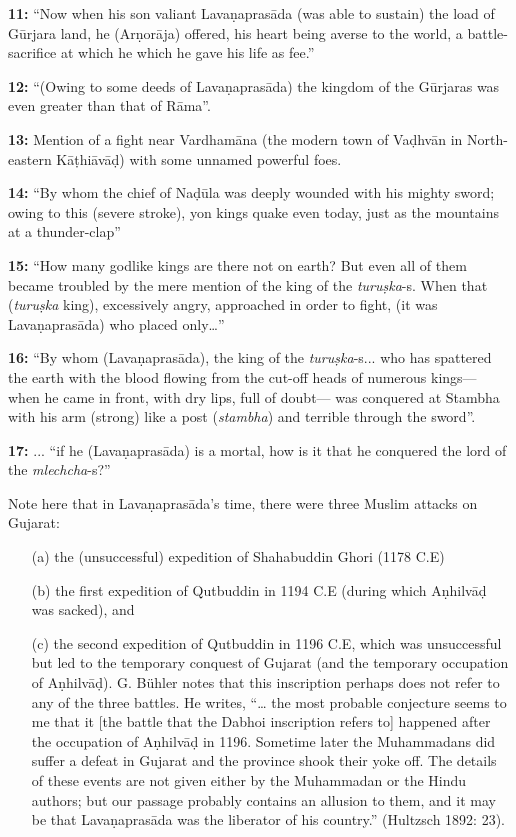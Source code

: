 \smallskip
\noindent
{\bf 11:} “Now when his son valiant Lavaṇaprasāda  (was able to sustain) the load of Gūrjara land, he (Arṇorāja) offered, his heart being averse to the world, a battle-sacrifice at which he which he gave his life as fee.”

\smallskip
\noindent
{\bf 12:} “(Owing to some deeds of Lavaṇaprasāda) the kingdom of the Gūrjaras was even greater than that of Rāma”. 

\smallskip
\noindent
{\bf 13:} Mention of a fight near Vardhamāna (the modern town of Vaḍhvān in North-eastern Kāṭhiāvāḍ) with some unnamed powerful foes.

\smallskip
\noindent
{\bf 14:} “By whom the chief of Naḍūla was deeply wounded with his mighty sword; owing to this (severe stroke), yon kings quake even today, just as the mountains at a thunder-clap”

\smallskip
\noindent
{\bf 15:} “How many godlike kings are there not on earth? But even all of them became troubled by the mere mention of the king of the {\sl turuṣka}-s. When that ({\sl turuṣka} king), excessively angry, approached in order to fight, (it was Lavaṇaprasāda) who placed only…”

\smallskip
\noindent
{\bf 16:} “By whom (Lavaṇaprasāda), the king of the {\sl turuṣka}-s... who has spattered the earth with the blood flowing from the cut-off heads of numerous kings— when he came in front, with dry lips, full of doubt— was conquered at Stambha with his arm (strong) like a post ({\sl stambha}) and terrible through the sword”.


\smallskip
\noindent
{\bf 17:} ... “if he (Lavaṇaprasāda) is a mortal, how is it that he conquered the lord of the {\sl mlechcha}-s?”

\smallskip
Note here that in Lavaṇaprasāda’s time, there were three Muslim attacks on Gujarat: 
\begin{itemize}
\item[(a)] the (unsuccessful) expedition of Shahabuddin Ghori  (1178 C.E) 
\item[(b)] the first expedition of Qutbuddin in 1194 C.E (during which Aṇhilvāḍ was sacked), and 
\item[(c)] the second expedition of Qutbuddin in 1196 C.E, which was unsuccessful but led to the temporary conquest of Gujarat (and the temporary occupation of Aṇhilvāḍ). G. Bühler notes that this inscription perhaps does not refer to any of the three battles. He writes, “… the most probable conjecture seems to me that it [the battle that the Dabhoi inscription refers to] happened after the occupation of Aṇhilvāḍ in 1196. Sometime later the Muhammadans did suffer a defeat in Gujarat and the province shook their yoke off. The details of these events are not given either by the Muhammadan or the Hindu authors; but our passage probably contains an allusion to them, and it may be that Lavaṇaprasāda was the liberator of his country.” (Hultzsch 1892: 23). 
\end{itemize}

